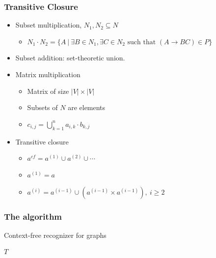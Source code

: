 \documentclass[xcolor=table]{beamer}
\begin{document}
\begin{frame}
  \frametitle{Transitive Closure}
  \begin{itemize}
    \item Subset multiplication, $N_1, N_2 \subseteq N$
    \begin{itemize}
      \item $N_1 \cdot N_2 = \{A~|~\exists B \in N_1, \exists C \in N_2 \text{ such that }(A \rightarrow B C) \in P\}$
    \end{itemize}
    \item Subset addition: set-theoretic union.
  \end{itemize}

  \begin{itemize}
    \item Matrix multiplication
    \begin{itemize}
      \item Matrix of size $|V| \times |V|$
      \item Subsets of $N$ are elements
      \item $c_{i,j} = \bigcup^{n}_{k=1}{a_{i,k} \cdot b_{k,j}}$
    \end{itemize}
  \end{itemize}
  \begin{itemize}
    \item Transitive closure
  \begin{itemize}
    \item $a^{cf} = a^{(1)} \cup a^{(2)} \cup \cdots$
    \item $a^{(1)} = a$
    \item $a^{(i)} = a^{(i-1)} \cup (a^{(i-1)} \times a^{(i-1)}), ~i \ge 2$
  \end{itemize}
\end{itemize}

\end{frame}

\begin{frame} \frametitle{The algorithm}

\begin{algorithm}[H]
\begin{algorithmic}[1]
\caption{Context-free recognizer for graphs}
\label{alg:graphParse}

    \EndFor

    \EndWhile
\State \Return $T$
\EndFunction
\end{algorithmic}
\end{algorithm}

\end{frame}
\end{document}
